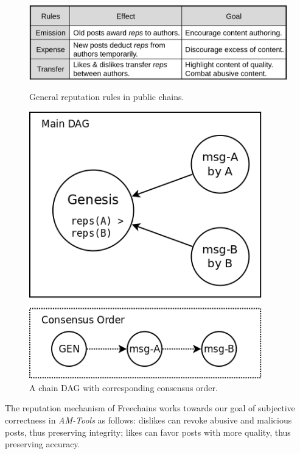 \documentclass[12pt]{article}
\newcommand{\AMT}      {\emph{AM-Tools}\xspace}
\begin{document}
\begin{figure}
    \centering
    \begin{minipage}{0.60\textwidth}
        \centering
        \includegraphics[width=\textwidth]{general.png}
        \caption{General reputation rules in public chains.}
        \label{fig.general}
    \end{minipage}\hfill
    \begin{minipage}{0.40\textwidth}
        \centering
        \includegraphics[width=0.9\textwidth]{dag.png}
        \caption{A chain DAG with corresponding consensus order.}
        \label{fig.dag}
    \end{minipage}
\end{figure}

The reputation mechanism of Freechains works towards our goal of subjective
correctness in \AMT as follows:
    dislikes can revoke abusive and malicious posts, thus preserving integrity;
    likes can favor posts with more quality, thus preserving accuracy.
\end{document}
